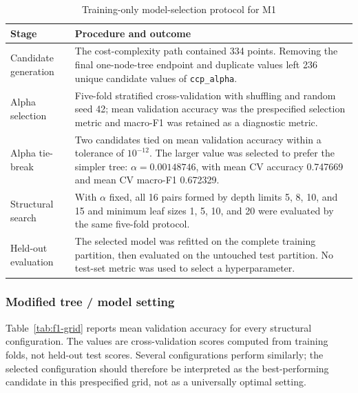 \begin{table}[H]
  \centering
  \small
  \caption{Training-only model-selection protocol for M1}
  \label{tab:f1-protocol}
  \begin{tabular}{@{}p{3.7cm}p{10.1cm}@{}}
    \toprule
    Stage & Procedure and outcome \\
    \midrule
    Candidate generation & The cost-complexity path contained 334 points.
      Removing the final one-node-tree endpoint and duplicate values left 236
      unique candidate values of \texttt{ccp\_alpha}. \\
    Alpha selection & Five-fold stratified cross-validation with shuffling
      and random seed 42; mean validation accuracy was the prespecified
      selection metric and macro-F1 was retained as a diagnostic metric. \\
    Alpha tie-break & Two candidates tied on mean validation accuracy within
      a tolerance of $10^{-12}$. The larger value was selected to prefer the
      simpler tree: $\alpha=0.00148746$, with mean CV accuracy 0.747669 and mean
      CV macro-F1 0.672329. \\
    Structural search & With $\alpha$ fixed, all 16 pairs formed by depth
      limits 5, 8, 10, and 15 and minimum leaf sizes 1, 5, 10, and 20 were
      evaluated by the same five-fold protocol. \\
    Held-out evaluation & The selected model was refitted on the complete
      training partition, then evaluated on the untouched test partition. No
      test-set metric was used to select a hyperparameter. \\
    \bottomrule
  \end{tabular}
\end{table}

\subsubsection{Modified tree / model setting}

Table~\ref{tab:f1-grid} reports mean validation accuracy for every structural
configuration. The values are cross-validation scores computed from training
folds, not held-out test scores. Several configurations perform similarly;
the selected configuration should therefore be interpreted as the
best-performing candidate in this prespecified grid, not as a universally
optimal setting.

